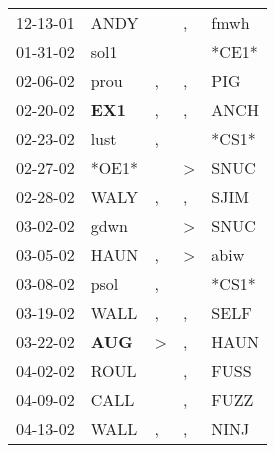 \begin{supertabular}{p{0.07\textwidth}p{0.06\textwidth}p{0.02\textwidth}p{0.02\textwidth}p{0.06\textwidth}}
 12-13-01\textsuperscript{} &           ANDY\textsuperscript{} &                  &                , &           fmwh\textsuperscript{} \\
 01-31-02\textsuperscript{} &           sol1\textsuperscript{} &                  &                  &                            *CE1* \\
 02-06-02\textsuperscript{} &           prou\textsuperscript{} &                , &                , &            PIG\textsuperscript{} \\
 02-20-02\textsuperscript{} &   \textbf{EX1\textsuperscript{}} &                , &                , &           ANCH\textsuperscript{} \\
 02-23-02\textsuperscript{} &           lust\textsuperscript{} &                , &                  &                            *CS1* \\
 02-27-02\textsuperscript{} &                            *OE1* &                  &     \textgreater &           SNUC\textsuperscript{} \\
 02-28-02\textsuperscript{} &           WALY\textsuperscript{} &                , &                , &           SJIM\textsuperscript{} \\
 03-02-02\textsuperscript{} &           gdwn\textsuperscript{} &                  &     \textgreater &           SNUC\textsuperscript{} \\
 03-05-02\textsuperscript{} &           HAUN\textsuperscript{} &                , &     \textgreater &           abiw\textsuperscript{} \\
 03-08-02\textsuperscript{} &           psol\textsuperscript{} &                , &                  &                            *CS1* \\
 03-19-02\textsuperscript{} &           WALL\textsuperscript{} &                , &                , &           SELF\textsuperscript{} \\
 03-22-02\textsuperscript{} &   \textbf{AUG\textsuperscript{}} &     \textgreater &                , &           HAUN\textsuperscript{} \\
 04-02-02\textsuperscript{} &           ROUL\textsuperscript{} &                  &                , &           FUSS\textsuperscript{} \\
 04-09-02\textsuperscript{} &           CALL\textsuperscript{} &                  &                , &           FUZZ\textsuperscript{} \\
 04-13-02\textsuperscript{} &           WALL\textsuperscript{} &                , &                , &           NINJ\textsuperscript{} \\

\end{supertabular}
